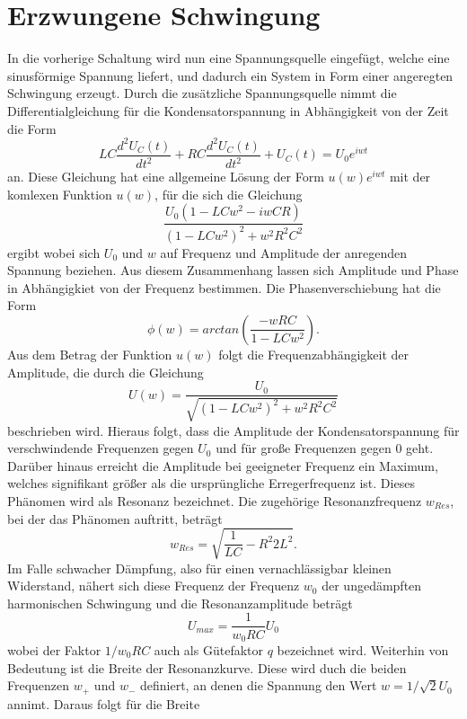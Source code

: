 \section{Erzwungene Schwingung}
In die vorherige Schaltung wird nun eine Spannungsquelle eingefügt, welche eine sinusförmige Spannung liefert, und dadurch ein System in Form einer angeregten Schwingung erzeugt. Durch die zusätzliche Spannungsquelle nimmt die Differentialgleichung für die Kondensatorspannung in Abhängigkeit von der Zeit die Form
\begin{equation}
LC\frac{d^2U_C(t)}{dt^2}+RC\frac{d^2U_C(t)}{dt^2}+U_C(t)=U_0e^{iwt}
\end{equation}
an. Diese Gleichung hat eine allgemeine Lösung der Form $u(w)e^{iwt}$ mit der komlexen Funktion $u(w)$, für die sich die Gleichung
\begin{equation*}
\frac{U_0(1-LCw^2-iwCR)}{(1-LCw^2)^2+w^2R^2C^2}
\end{equation*}
ergibt wobei sich $U_0$ und $w$ auf Frequenz und Amplitude der anregenden Spannung beziehen. Aus diesem Zusammenhang lassen sich Amplitude und Phase in Abhängigkiet von der Frequenz bestimmen. Die Phasenverschiebung hat die Form
\begin{equation}
\phi(w)=arctan(\frac{-wRC}{1-LCw^2}).
\end{equation}
Aus dem Betrag der Funktion $u(w)$ folgt die Frequenzabhängigkeit der Amplitude, die durch die Gleichung
\begin{equation*}
U(w)=\frac{U_0}{\sqrt{(1-LCw^2)^2+w^2R^2C^2}}
\end{equation*}
beschrieben wird. Hieraus folgt, dass die Amplitude der Kondensatorspannung für verschwindende Frequenzen gegen $U_0$ und für große Frequenzen gegen $0$ geht. Darüber hinaus erreicht die Amplitude bei geeigneter Frequenz ein Maximum, welches signifikant größer als die ursprüngliche Erregerfrequenz ist. Dieses Phänomen wird als Resonanz bezeichnet. Die zugehörige Resonanzfrequenz $w_{Res}$, bei der das Phänomen auftritt, beträgt
\begin{equation}
w_{Res}=\sqrt{\frac{1}{LC}-{R^2}{2L^2}}.
\end{equation}
 Im Falle schwacher Dämpfung, also für einen vernachlässigbar kleinen Widerstand, nähert sich diese Frequenz der Frequenz $w_0$ der ungedämpften harmonischen Schwingung und die Resonanzamplitude beträgt
\begin{equation}
U_{max}=\frac{1}{w_0RC}U_0
\end{equation}
wobei der Faktor $1/w_0RC$ auch als Gütefaktor $q$ bezeichnet wird. Weiterhin von Bedeutung ist die Breite der Resonanzkurve. Diese wird duch die beiden Frequenzen $w_+$ und $w_-$ definiert, an denen die Spannung den Wert $w=1/\sqrt{2}U_0$ annimt. Daraus folgt für die Breite
